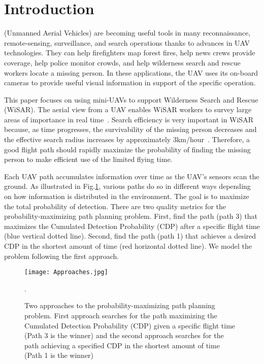 \documentclass[journal]{IEEEtran}
\begin{document}
\section{Introduction}
\label{sec:Introduction}

 (Unmanned Aerial Vehicles) are becoming useful tools in many reconnaissance, remote-sensing, surveillance, and search operations thanks to advances in UAV technologies. They can help firefighters map forest fires, help news crews provide coverage, help police monitor crowds, and help wilderness search and rescue workers locate a missing person. In these applications, the UAV uses its on-board cameras to provide useful visual information in support of the specific operation.

This paper focuses on using mini-UAVs to support Wilderness Search and Rescue (WiSAR). The aerial view from a UAV enables WiSAR workers to survey large areas of importance in real time~\cite{Goodrich2008FieldReport}. Search efficiency is very important in WiSAR because, as time progresses, the survivability of the missing person decreases and the effective search radius increases by approximately 3km/hour~\cite{Syrotuck2000Intro}. Therefore, a good flight path should rapidly maximize the probability of finding the missing person to make efficient use of the limited flying time.

Each UAV path accumulates information over time as the UAV's sensors scan the ground. As illustrated in Fig.\ref{TwoApproaches}, various paths do so in different ways depending on how information is distributed in the environment. The goal is to maximize the total probability of detection. There are two quality metrics for the probability-maximizing path planning problem. First, find the path (path 3) that maximizes the Cumulated Detection Probability (CDP) after a specific flight time (blue vertical dotted line). Second, find the path (path 1) that achieves a desired CDP in the shortest amount of time (red horizontal dotted line). We model the problem following the first approach.
\begin{figure}
\centering
\texttt{[image: Approaches.jpg]}
\caption{Two approaches to the probability-maximizing path planning problem. First approach searches for the path maximizing the Cumulated Detection Probability (CDP) given a specific flight time (Path 3 is the winner) and the second approach searches for the path achieving a specified CDP in the shortest amount of time (Path 1 is the winner)}. 
\label{TwoApproaches}
\end{figure}
\end{document}

